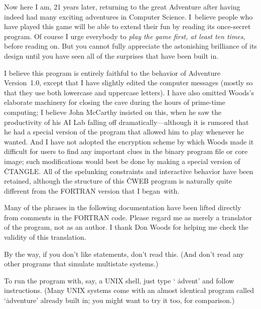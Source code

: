 Now here I am, 21 years later, returning to the great Adventure after
having indeed had many exciting adventures in Computer Science. I~believe
people who have played this game will be able to extend their fun by
reading its once-secret program. Of course I urge everybody to {\it play the
game first, at least ten times}, before reading on. But you cannot
fully appreciate the astonishing brilliance of its design until
you have seen all of the surprises that have been built in.

I believe this program is entirely faithful to the behavior of Adventure
Version~1.0, except that I have slightly edited the computer messages
(mostly so that they use both lowercase and uppercase letters). I have also
omitted Woods's elaborate machinery for closing the cave during the hours
of prime-time computing; I believe John McCarthy insisted on this, when
he saw the productivity of his AI Lab falling off dramatically---although
it is rumored that he had a special version of the program that
allowed him to play whenever he wanted. And I have
not adopted the encryption scheme by which Woods made it difficult for
users to find any important clues in
the binary program file or core image; such
modifications would best be done by making a special version of \.{CTANGLE}.
All of the spelunking constraints and interactive behavior have
been retained, although the structure of this \.{CWEB} program is
naturally quite different from the {\mc FORTRAN} version that I began~with.

Many of the phrases in the following documentation have been lifted directly
from comments in the {\mc FORTRAN} code. Please regard me as merely
a translator of the program, not as an author. I thank Don Woods for
helping me check the validity of this translation.

By the way, if you don't like  statements, don't read this. (And
don't
read any other programs that simulate multistate systems.)

\smallskip{}

\Y\B{}\par
\fi

To run the program with, say, a {\mc UNIX} shell, just type `%
\.{advent}'
and follow instructions. (Many {\mc UNIX} systems come with an
almost identical program called `\.{adventure}' already built in;
you might want to try it too, for comparison.)


